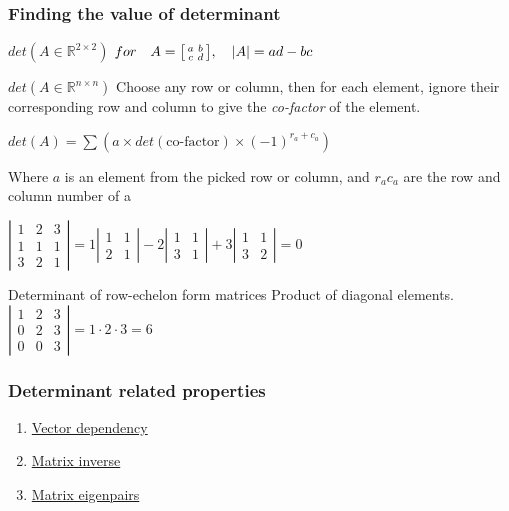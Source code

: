 \documentclass{article}
\begin{document}
\subsubsection{Finding the value of determinant}
\begin{knBox}[]{$det(A\in \mathds{R}^{2\times 2})$}
    $for\quad A=\begin{bsmallmatrix}
            a&b\\c&d
        \end{bsmallmatrix},\quad |A| = ad - bc$
\end{knBox}
\begin{knBox}[]{$det(A\in \mathds{R}^{n\times n})$}
    Choose any row or column, then for each element, ignore their corresponding row and column to give the \emph{co-factor} of the element.

    $det(A) = \sum(a\times det(\text{co-factor})\times (-1)^{r_a+c_a})$

    Where $a$ is an element from the picked row or column, and $r_a c_a$ are the row and column number of a

    \tcblower

    $|\begin{smallmatrix}1&2&3\\1&1&1\\3&2&1\end{smallmatrix}|=1|\begin{smallmatrix}
            1&1\\2&1
        \end{smallmatrix}|-2|\begin{smallmatrix}
            1&1\\3&1
        \end{smallmatrix}|+3|\begin{smallmatrix}
            1&1\\3&2
        \end{smallmatrix}|=0$

\end{knBox}
\begin{knBox}[]{Determinant of row-echelon form matrices}
    Product of diagonal elements.
    $|\begin{smallmatrix}
            1&2&3\\0&2&3\\0&0&3
        \end{smallmatrix}|=1\cdot 2\cdot 3=6$
\end{knBox}
\subsubsection{Determinant related properties}
\begin{enumerate}
    \item \hyperref[sec:dep]{Vector dependency}
    \item \hyperref[sec:inv]{Matrix inverse}
    \item \hyperref[sec:eigen]{Matrix eigenpairs}
\end{enumerate}
\end{document}
